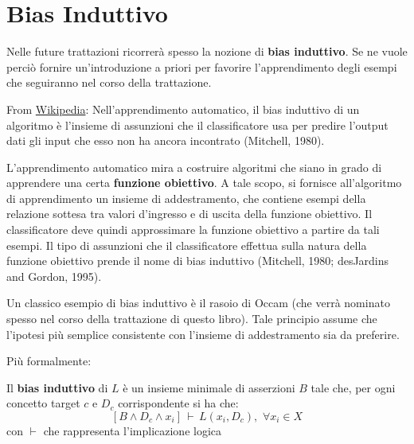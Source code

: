 \section{Bias Induttivo}
Nelle future trattazioni ricorrerà spesso la nozione di \textbf{bias induttivo}. Se ne vuole perciò fornire un'introduzione a priori per favorire l'apprendimento degli esempi che seguiranno nel corso della trattazione.
\begin{definizione}
  From \href{https://it.wikipedia.org/wiki/Bias_induttivo}{Wikipedia}: Nell'apprendimento automatico, il bias induttivo di un algoritmo è l'insieme di assunzioni che il classificatore usa per predire l'output dati gli input che esso non ha ancora incontrato (Mitchell, 1980).

L'apprendimento automatico mira a costruire algoritmi che siano in grado di apprendere una certa \textbf{funzione obiettivo}. A tale scopo, si fornisce all'algoritmo di apprendimento un insieme di addestramento, che contiene esempi della relazione sottesa tra valori d'ingresso e di uscita della funzione obiettivo. Il classificatore deve quindi approssimare la funzione obiettivo a partire da tali esempi. Il tipo di assunzioni che il classificatore effettua sulla natura della funzione obiettivo prende il nome di bias induttivo (Mitchell, 1980; desJardins and Gordon, 1995).

Un classico esempio di bias induttivo è il rasoio di Occam (che verrà nominato spesso nel corso della trattazione di questo libro). Tale principio assume che l'ipotesi più semplice consistente con l'insieme di addestramento sia da preferire. 
\end{definizione}
Più formalmente:
\begin{definizione} 
  Il \textbf{bias induttivo} di $L$ è un insieme
  minimale di asserzioni $B$ tale 
  che, per ogni concetto target $c$ e $D_c$ corrispondente si ha che:
  \[[B\land D_c\land x_i]\,\vdash\, L(x_i, D_c),\,\,\forall x_i\in X\]
  con $\vdash$ che rappresenta l'implicazione logica
\end{definizione}
